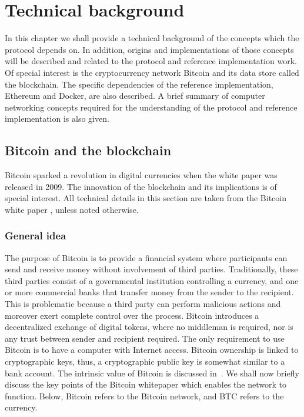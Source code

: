 \chapter{Technical background}
In this chapter we shall provide a technical background of the concepts which the protocol depends on. In addition, origins and implementations of those concepts will be described and related to the protocol and reference implementation work. Of special interest is the cryptocurrency network Bitcoin and its data store called the blockchain. The specific dependencies of the reference implementation, Ethereum and Docker, are also described. A brief summary of computer networking concepts required for the understanding of the protocol and reference implementation is also given.

\section{Bitcoin and the blockchain}
Bitcoin sparked a revolution in digital currencies when the white paper was released in 2009. The innovation of the blockchain and its implications is of special interest. All technical details in this section are taken from the Bitcoin white paper \cite{btc}, unless noted otherwise.

\subsection{General idea}
The purpose of Bitcoin is to provide a financial system where participants can send and receive money without involvement of third parties. Traditionally, these third parties consist of a governmental institution controlling a currency, and one or more commercial banks that transfer money from the sender to the recipient. This is problematic because a third party can perform malicious actions and moreover exert complete control over the process. Bitcoin introduces a decentralized exchange of digital tokens, where no middleman is required, nor is any trust between sender and recipient required. The only requirement to use Bitcoin is to have a computer with Internet access. Bitcoin ownership is linked to cryptographic keys, thus, a cryptographic public key is somewhat similar to a bank account. The intrinsic value of Bitcoin is discussed in~\cite{buterin:2011}. We shall now briefly discuss the key points of the Bitcoin whitepaper which enables the network to function. Below, Bitcoin refers to the Bitcoin network, and BTC refers to the currency.

